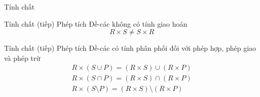 \documentclass[11pt, handout]{beamer}
\begin{document}
  \begin{frame}{Tính chất}
  \end{frame}
  \begin{frame}{Tính chất (tiếp)}
    Phép tích Đề-các không có tính giao hoán
    $$R \times S \neq S \times R$$
  \end{frame}
  \begin{frame}{Tính chất (tiếp)}
    Phép tích Đề-các có tính phân phối đối với phép hợp, phép giao và phép trừ
    \begin{gather*}
      R \times (S \cup P) = (R \times S) \cup (R \times P) \\
      R \times (S \cap P) = (R \times S) \cap (R \times P) \\
      R \times (S \setminus P) = (R \times S) \setminus (R \times P)
    \end{gather*}
  \end{frame}
\end{document}

